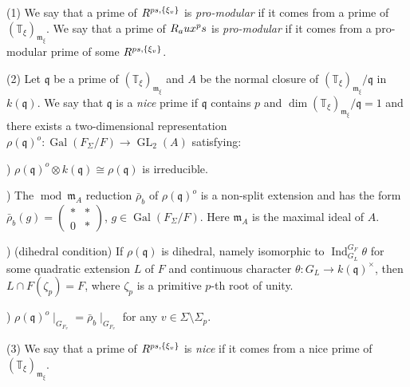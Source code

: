\documentclass[10pt,a4paper]{amsart}
\begin{document}
\begin{defn}\label{nice}
	(1) We say that a prime  of $ R^{\textnormal{ps}, \{\xi_v\}}$ is \textit{pro-modular} if it comes from a prime of $(\mathbb{T}_{\xi})_{\mathfrak{m}_{\xi}} $. We say that a prime of $ R_\textnormal{aux}^\textnormal{ps}$ is \textit{pro-modular} if it comes from a pro-modular prime of some $ R^{\textnormal{ps}, \{\xi_v\}}$.
	
	(2) Let $\mathfrak{q} $ be a prime of $ (\mathbb{T}_{\xi})_{\mathfrak{m}_{\xi}} $ and $A$ be the normal closure of $(\mathbb{T}_{\xi})_{\mathfrak{m}_{\xi}} / \mathfrak{q} $ in $k(\mathfrak{q})$. We say that $\mathfrak{q} $ is a \textit{nice} prime if $\mathfrak{q} $ contains $p$ and $\operatorname{dim} (\mathbb{T}_{\xi})_{\mathfrak{m}_{\xi}} / \mathfrak{q}=1$ and there exists a two-dimensional representation $\rho(\mathfrak{q})^o : \operatorname{Gal}(F_{\Sigma}/F) \to \operatorname{GL}_2(A)$ satisfying:
	
	) $\rho(\mathfrak{q})^o \otimes k(\mathfrak{q}) \cong \rho(\mathfrak{q})$ is irreducible.
	
	) The $\operatorname{mod}~\mathfrak{m}_A$ reduction $\bar{\rho}_b$ of $\rho(\mathfrak{q})^o$ is a non-split extension and has the form $ \bar{\rho}_b(g)=\begin{pmatrix}
		* & *\\
		0 & *
	\end{pmatrix}$, $g \in \operatorname{Gal}(F_{\Sigma}/F)$. Here $\mathfrak{m}_A $ is the maximal ideal of $A$.
	
	) (dihedral condition) If $\rho(\mathfrak{q}) $ is dihedral, namely isomorphic to $\operatorname{Ind}_{G_L}^{G_F} \theta$ for some quadratic extension $L$ of $F$ and continuous character $\theta: G_L \to k(\mathfrak{q})^\times$, then $L \cap F(\zeta_p) = F$,
	where $\zeta_p $ is a primitive $p$-th root of unity.
	
	) $\rho(\mathfrak{q})^o \mid_{G_{F_v}} = \bar{\rho}_b \mid_{G_{F_v}} $ for any $v \in \Sigma \setminus \Sigma_p$.
	
	(3) We say that a prime of $ R^{\textnormal{ps}, \{\xi_v\}}$ is \textit{nice} if it comes from a nice prime of $(\mathbb{T}_{\xi})_{\mathfrak{m}_{\xi}} $.
	
\end{defn}
\end{document}
